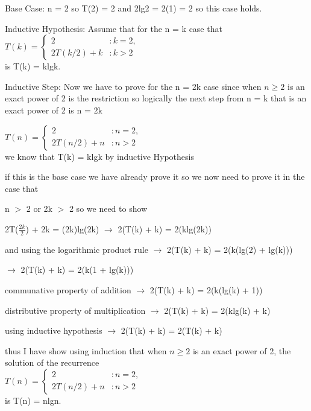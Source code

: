 \begin{description}
\item{Base Case: } 
n = 2 so T(2)  = 2 and 2lg2 = 2(1) = 2 so this case holds. 

\item{Inductive Hypothesis: }
Assume that for the n = k case that 
$T(k)=\begin{cases}
2 & :k=2, \\
2T(k/2)+k & :k > 2
\end{cases}$ \\
is T(k) = klgk.

\item{Inductive Step: } Now we have to prove for the n = 2k case since  when $n \geq 2$ is an exact power of 2 is the restriction
so logically the next step from n = k that is an exact power of 2 is n = 2k 

$T(n)=\begin{cases}
2 & :n=2, \\
2T(n/2)+n & :n > 2
\end{cases}$ \\

we know that T(k) = klgk by inductive Hypothesis

if this is the base case we have already prove it so we now need to prove it in the case that 

n $>$ 2 or 2k $>$ 2  so we need to show 

2T($\frac{2k}{2}$) + 2k = (2k)lg(2k) $\rightarrow$ 2(T(k) + k) = 2(klg(2k))

and using the logarithmic product rule 
$\rightarrow$ 2(T(k) + k) = 2(k(lg(2) + lg(k)))

$\rightarrow$ 2(T(k) + k) = 2(k(1 + lg(k)))

communative property of addition
$\rightarrow$ 2(T(k) + k) = 2(k(lg(k) + 1))

distributive property of multiplication
$\rightarrow$ 2(T(k) + k) = 2(klg(k) + k)

using inductive hypothesis
$\rightarrow$ 2(T(k) + k) = 2(T(k) + k)

thus I have show using induction that 
when $n \geq 2$ is an exact power of 2, the
solution of the recurrence \\
$T(n)=\begin{cases}
2 & :n=2, \\
2T(n/2)+n & :n > 2
\end{cases}$ \\
is T(n) = nlgn. \\
\end{description}

